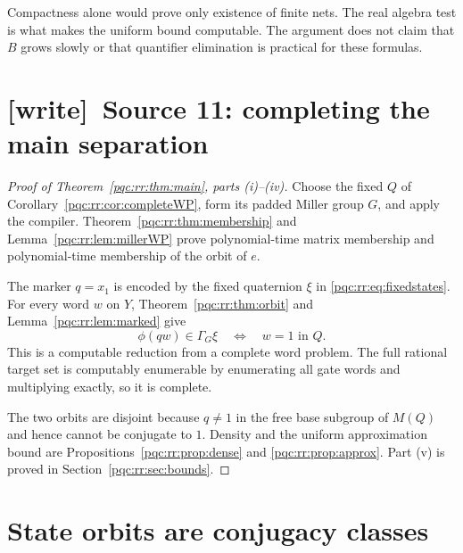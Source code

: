 \documentclass[11pt,letterpaper]{article}
\numberwithin{equation}{section}
\theoremstyle{definition}
\theoremstyle{remark}
\newcommand{\wtag}{\textup{[write]}}
\newcommand{\srcmark}[1]{\par\noindent{\small\itshape [source~#1]}\par}
\begin{document}
Compactness alone would prove only existence of finite nets. The real
algebra test is what makes the uniform bound computable. The argument
does not claim that $B$ grows slowly or that quantifier elimination is
practical for these formulas.

\section{\wtag\ Source 11: completing the main separation}
\label{pqc:gates:sec:rr-main}
\begin{proof}[Proof of Theorem~\ref{pqc:rr:thm:main}, parts (i)--(iv)]
Choose the fixed $Q$ of Corollary~\ref{pqc:rr:cor:completeWP}, form its padded
Miller group $G$, and apply the compiler. Theorem~\ref{pqc:rr:thm:membership}
and Lemma~\ref{pqc:rr:lem:millerWP} prove polynomial-time matrix membership and
polynomial-time membership of the orbit of $e$.

The marker $q=x_1$ is encoded by the fixed quaternion $\xi$ in
\eqref{pqc:rr:eq:fixedstates}. For every word $w$ on $Y$, Theorem~\ref{pqc:rr:thm:orbit}
and Lemma~\ref{pqc:rr:lem:marked} give
\begin{equation}\label{pqc:rr:eq:hardreduction}
 \phi(qw)\in\Gamma_G\xi
 \quad\Longleftrightarrow\quad w=1\text{ in }Q.
\end{equation}
This is a computable reduction from a complete word problem. The full
rational target set is computably enumerable by enumerating all gate
words and multiplying exactly, so it is complete.

The two orbits are disjoint because $q\ne1$ in the free base subgroup of
$M(Q)$ and hence cannot be conjugate to $1$. Density and the uniform
approximation bound are Propositions~\ref{pqc:rr:prop:dense} and
\ref{pqc:rr:prop:approx}. Part (v) is proved in
Section~\ref{pqc:rr:sec:bounds}.
\end{proof}

\section{State orbits are conjugacy classes}
\label{pqc:rr:sec:orbit}
\srcmark{11}
\end{document}
